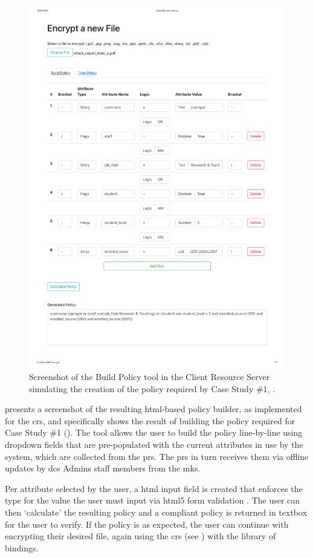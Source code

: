 \begin{figure}
    \centering
    \includegraphics[width=\linewidth,keepaspectratio]{appendices/building_policy.pdf}

    \caption{
      \label{fig:policy_builder}
      Screenshot of the Build Policy tool in the Client Resource Server simulating the creation of the policy required by Case Study \#1, .
    }

\end{figure}

 presents a screenshot of the resulting \acrshort{html}-based policy builder, as implemented for the \acrshort{crs}, and specifically shows the result of building the policy required for Case Study \#1 (). The tool allows the user to build the policy line-by-line using dropdown fields that are pre-populated with the current attributes in use by the \theResServer system, which are collected from the \acrshort{prs}. The \acrshort{prs} in turn receives them via offline updates by \acrshort{dcs} Admins staff members from the \acrshort{mks}.

Per attribute selected by the user, a \acrshort{html} input field is created that enforces the type for the value the user must input via \acrshort{html}5 form validation \citep{Foundation2019}. The user can then `calculate' the resulting policy and a \PyOpenABE compliant policy is returned in textbox for the user to verify. If the policy is as expected, the user can continue with encrypting their desired file, again using the \acrshort{crs} (see ) with the \PyOpenABE library of bindings.

